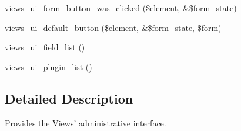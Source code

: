 \begin{DoxyCompactItemize}
\item 
\hyperlink{admin_8inc_acec4a5aeaa4ce37c0cd093b55c7704fc}{views\_\-ui\_\-form\_\-button\_\-was\_\-clicked} (\$element, \&\$form\_\-state)
\item 
\hyperlink{admin_8inc_a712ec13f84195dec18693eebbdbc3f4c}{views\_\-ui\_\-default\_\-button} (\$element, \&\$form\_\-state, \$form)
\item 
\hyperlink{admin_8inc_a4e024c95c4341af36a85972510cd570e}{views\_\-ui\_\-field\_\-list} ()
\item 
\hyperlink{admin_8inc_a57ee9e613d22ff7c9a617f7e791e4e7e}{views\_\-ui\_\-plugin\_\-list} ()
\end{DoxyCompactItemize}


\subsection{Detailed Description}
Provides the Views' administrative interface. 

